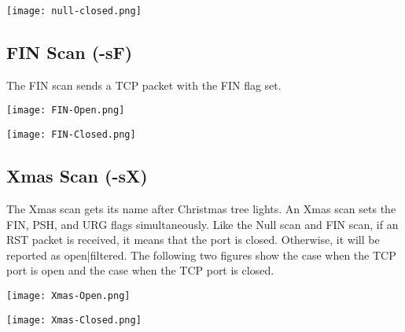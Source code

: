 \documentclass[11pt,a4paper]{article}
\begin{document}
\begin{center}
  \texttt{[image: null-closed.png]}
  \label{fig:null-closed}
\end{center}

\clearpage
\subsection{FIN Scan (-sF)}
The FIN scan sends a TCP packet with the FIN flag set.

\begin{center}
  \texttt{[image: FIN-Open.png]}
  \label{fig:FIN-Open}
\end{center}

\begin{center}
  \texttt{[image: FIN-Closed.png]}
  \label{fig:FIN-Closed}
\end{center}

\subsection{Xmas Scan (-sX)}
The Xmas scan gets its name after Christmas tree lights. An Xmas scan
sets the FIN, PSH, and URG flags simultaneously. Like the Null scan
and FIN scan, if an RST packet is received, it means that the port is
closed. Otherwise, it will be reported as open|filtered. The
following two figures show the case when the TCP port is open and the
case when the TCP port is closed.

\begin{center}
  \texttt{[image: Xmas-Open.png]}
  \label{fig:Xmas-Open}
\end{center}

\begin{center}
  \texttt{[image: Xmas-Closed.png]}
  \label{fig:Xmas-Closed}
\end{center}
\end{document}
